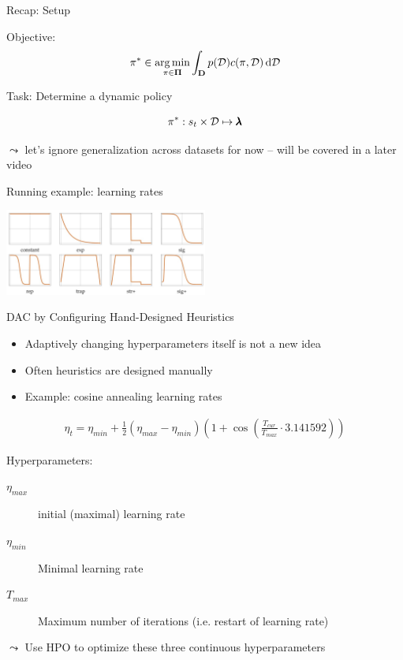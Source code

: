 \begin{frame}[c]{Recap: Setup}
	
	Objective:
	\begin{equation}
	\pi^* \in \operatorname*{arg\,min}_{\pi \in \mathbf{\Pi}} \int_{\mathbf{D}} p(\mathcal{D}) c(\pi, \mathcal{D}) \mathop{}\!\mathrm{d} \mathcal{D} \nonumber
	\end{equation}
	
	\bigskip
	
	Task: Determine a dynamic policy
	
	$$\pi^* : s_t \times \mathcal{D} \mapsto \pmb{\lambda}$$
	
	$\leadsto$ let's ignore generalization across datasets for now -- will be covered in a later video
	\bigskip
	
	Running example: learning rates
	
	\centering
		\includegraphics[width=0.5\textwidth]{images/learning_rates}
	
\end{frame}
\begin{frame}[c]{DAC by Configuring Hand-Designed Heuristics}
	
	
	\begin{itemize}
	    \item Adaptively changing hyperparameters itself is not a new idea
	    \item Often heuristics are designed manually
	    \item Example: cosine annealing learning rates 
	\end{itemize}
	
	\begin{eqnarray}
	         \eta_t = \eta_{min} + \frac{1}{2}(\eta_{max} - \eta_{min})\left(1 +
        \cos\left(\frac{T_{cur}}{T_{max}} \cdot 3.141592 \right)\right)
	\end{eqnarray}
	
	Hyperparameters:
	\begin{description}
	    \item[$\eta_{max}$] initial (maximal) learning rate
	    \item[$\eta_{min}$] Minimal learning rate
	    \item[$T_{max}$] Maximum number of iterations (i.e. restart of learning rate)
	\end{description}
	
	$\leadsto$ Use HPO to optimize these three continuous hyperparameters
	
\end{frame}
